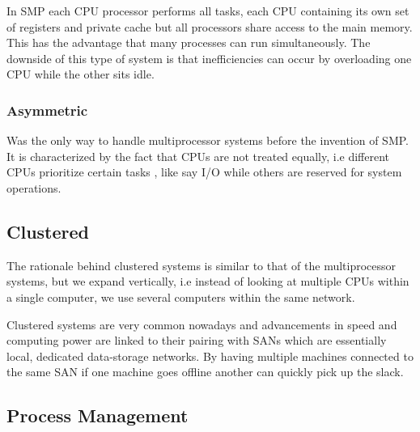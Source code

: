 			\par{In SMP each CPU processor performs all tasks, each CPU containing its own set of registers and private cache but all processors share access to the main memory. This has the advantage that many processes can run simultaneously. The downside of this type of system is that inefficiencies can occur by overloading one CPU while the other sits idle.}


		\subsubsection{Asymmetric}

			\par{Was the only way to handle multiprocessor systems before the invention of SMP. It is characterized by the fact that CPUs are not treated equally, i.e different CPUs prioritize certain tasks , like say I/O while others are reserved for system operations.}

	\subsection{Clustered}

		\par{The rationale behind clustered systems is similar to that of the multiprocessor systems, but we expand vertically, i.e instead of looking at multiple CPUs within a single computer, we use several computers within the same network.}
		\par{Clustered systems are very common nowadays and advancements in speed and computing power are linked to their pairing with SANs which are essentially local, dedicated data-storage networks. By having multiple machines connected to the same SAN if one machine goes offline another can quickly pick up the slack.}





\subsection{Process Management}

